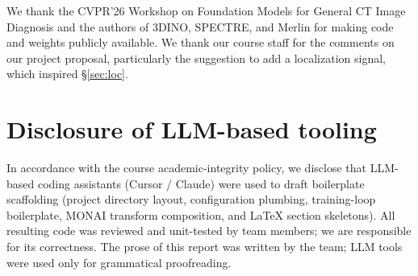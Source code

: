\documentclass{article}
\begin{document}
We thank the CVPR'26 Workshop on Foundation Models for General CT
Image Diagnosis and the authors of 3DINO, SPECTRE, and Merlin for
making code and weights publicly available. We thank our course staff
for the comments on our project proposal, particularly the suggestion
to add a localization signal, which inspired \S\ref{sec:loc}.

\section*{Disclosure of LLM-based tooling}

In accordance with the course academic-integrity policy, we disclose
that LLM-based coding assistants (Cursor / Claude) were used to draft
boilerplate scaffolding (project directory layout, configuration
plumbing, training-loop boilerplate, MONAI transform composition, and
LaTeX section skeletons). All resulting code was reviewed and
unit-tested by team members; we are responsible for its correctness.
The prose of this report was written by the team; LLM tools were used
only for grammatical proofreading.



\end{document}
